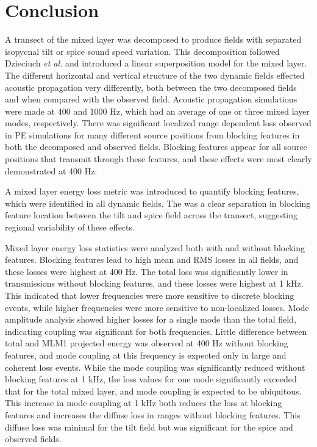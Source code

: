 \documentclass[preprint,NumberedRefs]{JASA}
\begin{document}
\section{Conclusion}\label{sec:conclusion}
A transect of the mixed layer was decomposed to produce fields with separated isopycnal tilt or spice sound speed variation. This decomposition followed Dzieciuch \emph{et al.}\citep{dzieciuch2004} and introduced a linear superposition model for the mixed layer. The different horizontal and vertical structure of the two dynamic fields effected acoustic propagation very differently, both between the two decomposed fields and when compared with the observed field. Acoustic propagation simulations were made at 400 and 1000 Hz, which had an average of one or three mixed layer modes, respectively. There was significant localized range dependent loss observed in PE simulations for many different source positions from blocking features in both the decomposed and observed fields. Blocking features appear for all source positions that transmit through these features, and these effects were most clearly demonstrated at 400 Hz.

A mixed layer energy loss metric was introduced to quantify blocking features, which were identified in all dynamic fields. The was a clear separation in blocking feature location between the tilt and spice field across the transect, suggesting regional variability of these effects.

Mixed layer energy loss statistics were analyzed both with and without blocking features. Blocking features lead to high mean and RMS losses in all fields, and these losses were highest at 400 Hz. The total loss was significantly lower in transmissions without blocking features, and these losses were highest at 1 kHz. This indicated that lower frequencies were more sensitive to discrete blocking events, while higher frequencies were more sensitive to non-localized losses. Mode amplitude analysis showed higher losses for a single mode than the total field, indicating coupling was significant for both frequencies. Little difference between total and MLM1 projected energy was observed at 400 Hz without blocking features, and mode coupling at this frequency is expected only in large and coherent loss events. While the mode coupling was significantly reduced without blocking features at 1 kHz, the loss values for one mode significantly exceeded that for the total mixed layer, and mode coupling is expected to be ubiquitous. This increase in mode coupling at 1 kHz both reduces the loss at blocking features and increases the diffuse loss in ranges without blocking features. This diffuse loss was minimal for the tilt field but was significant for the spice and observed fields.


\end{document}
